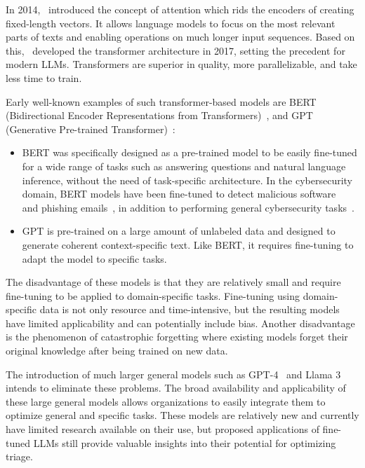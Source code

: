 In 2014,\ \citet{bahdanau2014neural} introduced the concept of attention which rids the encoders of creating
fixed-length vectors.
It allows language models to focus on the most relevant parts of texts and enabling operations on much longer input
sequences.
Based on this,\ \citet{vaswani2017attention} developed the transformer architecture in 2017, setting the precedent for
modern LLMs.
Transformers are superior in quality, more parallelizable, and take less time to train.

Early well-known examples of such transformer-based models are BERT
(Bidirectional Encoder Representations from Transformers)\ \citep{devlin2018bert}, and
GPT (Generative Pre-trained Transformer)\ \citep{radford2018improving}:
\begin{itemize}
    \item BERT was specifically designed as a pre-trained model to be easily fine-tuned for a wide range of tasks such
    as answering questions and natural language inference, without the need of task-specific architecture.
    In the cybersecurity domain, BERT models have been fine-tuned to detect malicious
    software\ \citep{rahali2021malbert} and phishing emails\ \citep{lee2020catbert}, in addition to performing general
    cybersecurity tasks\ \citep{bayer2024cysecbert}.

    \item GPT is pre-trained on a large amount of unlabeled data and designed to generate coherent context-specific
    text.
    Like BERT, it requires fine-tuning to adapt the model to specific tasks.
\end{itemize}

The disadvantage of these models is that they are relatively small and require fine-tuning to be applied to
domain-specific tasks.
Fine-tuning using domain-specific data is not only resource and time-intensive, but the resulting models have limited
applicability and can potentially include bias.
Another disadvantage is the phenomenon of catastrophic forgetting where existing models forget their original knowledge
after being trained on new data.

The introduction of much larger general models such as GPT-4\ \citep{achiam2023gpt} and Llama 3\ \citep{meta:llama3}
intends to eliminate these problems.
The broad availability and applicability of these large general models allows organizations to easily integrate them to
optimize general and specific tasks.
These models are relatively new and currently have limited research available on their use, but proposed
applications of fine-tuned LLMs still provide valuable insights into their potential for optimizing triage.

